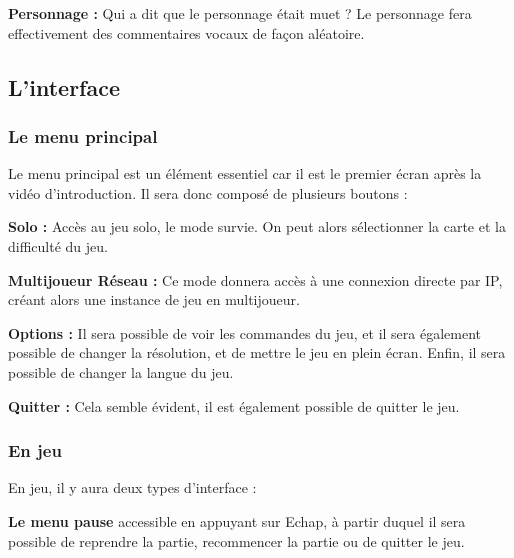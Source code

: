 \documentclass{article}
\begin{document}
\par
\textbf{Personnage :} Qui a dit que le personnage était muet ? Le personnage fera effectivement des commentaires vocaux de façon aléatoire.
\newline

\subsection{L'interface}

\subsubsection{Le menu principal}

\par
Le menu principal est un élément essentiel car il est le premier écran après la vidéo d'introduction. Il sera donc composé de plusieurs boutons :
\newline

\par
\textbf{Solo :} Accès au jeu solo, le mode survie. On peut alors sélectionner la carte et la difficulté du jeu.
\newline

\par
\textbf{Multijoueur Réseau :} Ce mode donnera accès à une connexion directe par IP, créant alors une instance de jeu en multijoueur.
\newline

\par
\textbf{Options :} Il sera possible de voir les commandes du jeu, et il sera également possible de changer la résolution, et de mettre le jeu en plein écran. Enfin, il sera possible de changer la langue du jeu.
\newline

\par
\textbf{Quitter :} Cela semble évident, il est également possible de quitter le jeu. 
\newline

\subsubsection{En jeu}

\par
En jeu, il y aura deux types d'interface :
\newline

\par
\textbf{Le menu pause} accessible en appuyant sur Echap, à partir duquel il sera possible de reprendre la partie, recommencer la partie ou de quitter le jeu.
\newline
\end{document}
